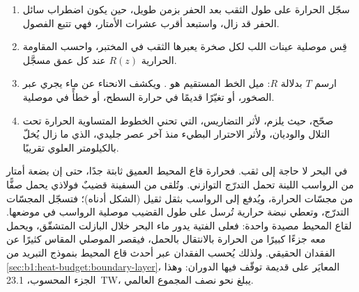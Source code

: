 \begin{method}\label{met:b1:heat-budget:borehole}
\begin{enumerate}
  \item سجّل الحرارة على طول الثقب بعد الحفر بزمن طويل، حين يكون اضطراب سائل الحفر قد زال، واستبعد أقرب عشرات الأمتار، فهي تتبع الفصول.
  \item قِس موصلية عينات اللب لكل صخرة يعبرها الثقب في المختبر، واحسب المقاومة الحرارية $R(z)$ عند كل عمق مسجَّل.
  \item ارسم $T$ بدلالة $R$: ميل الخط المستقيم هو . ويكشف الانحناء عن ماء يجري عبر الصخور، أو تغيّرًا قديمًا في حرارة السطح، أو خطأً في موصلية.
  \item صحّح، حيث يلزم، لأثر التضاريس، التي تحني الخطوط المتساوية الحرارة تحت التلال والوديان، ولأثر الاحترار البطيء منذ آخر عصر جليدي، الذي ما زال يُخلّ بالكيلومتر العلوي تقريبًا.
\end{enumerate}
\end{method}

في البحر لا حاجة إلى ثقب. فحرارة قاع المحيط العميق ثابتة جدًا، حتى إن بضعة أمتار من الرواسب اللينة تحمل التدرّج التوازني. وتُلقى من السفينة قضيبٌ فولاذي يحمل صفًّا من مجسّات الحرارة، ويُدفع إلى الرواسب بثقل ثقيل (الشكل أدناه)؛ فتسجّل المجسّات التدرّج، وتعطي نبضة حرارية تُرسل على طول القضيب موصلية الرواسب في موضعها.
لقاع المحيط مصيدة واحدة: فعلى  الفتية يدور ماء البحر خلال البازلت المتشقّق، ويحمل معه جزءًا كبيرًا من الحرارة بالانتقال بالحمل، فيقصر  الموصلي المقاس كثيرًا عن الفقدان الحقيقي. ولذلك يُحسب الفقدان عبر أحدث قاع المحيط بنموذج التبريد من \cref{sec:b1:heat-budget:boundary-layer}، المعايَر على  قديمة توقّف فيها الدوران: وهذا الجزء المحسوب، \qty{23.1}{TW}، يبلغ نحو نصف المجموع العالمي. %


